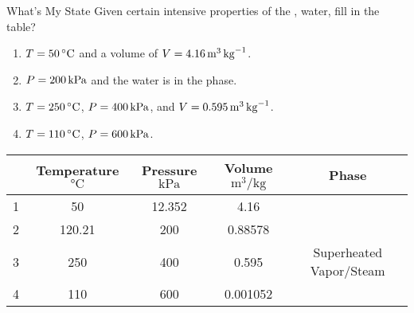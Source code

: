 \begin{example}[Problem 4.23]{What's My State}
  Given certain intensive properties of the , water, fill in the table?
  \begin{enumerate}[noitemsep]
  \item $\Temp = \SI{50}{\degreeCelsius}$ and a volume of $V = \SI{4.16}{\meter\cubed\per\kilo\gram}$.
  \item $P = \SI{200}{\kilo\pascal}$ and the water is in the  phase.
  \item $\Temp = \SI{250}{\degreeCelsius}$, $P = \SI{400}{\kilo\pascal}$, and $V = \SI{0.595}{\meter\cubed\per\kilo\gram}$.
  \item $\Temp = \SI{110}{\degreeCelsius}$, $P = \SI{600}{\kilo\pascal}$.
  \end{enumerate}
  \tcblower{}
  \begin{center}
    \begin{tabular}{ccccc}
      \toprule
      & Temperature $\si{\degreeCelsius}$ & Pressure $\si{\kilo\pascal}$ & Volume $\si{\meter\cubed\per\kilo\gram}$ & Phase \\
      \midrule
      1 & 50 & 12.352 & 4.16 & \nameref{def:Saturated_Mixture} \\
      2 & 120.21 & 200 & 0.88578 & \nameref{def:Saturated_Vapor} \\
      3 & 250 & 400 & 0.595 & Superheated Vapor/Steam \\
      4 & 110 & 600 & 0.001052 & \nameref{def:Compressed_Liquid} \\
      \bottomrule
    \end{tabular}
  \end{center}


\end{example}
